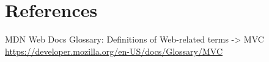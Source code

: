 \documentclass[table, 12pt]{article}
\begin{document}
\section{References}


\begin{thebibliography}{9}
    MDN Web Docs Glossary: Definitions of Web-related terms -> MVC
    \url{https://developer.mozilla.org/en-US/docs/Glossary/MVC}
    
\end{thebibliography}
\end{document}
